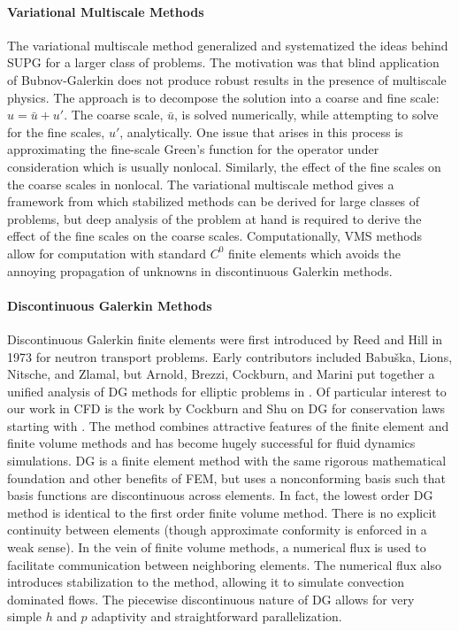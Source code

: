 \documentclass[Dissertation.tex]{subfiles}
\begin{document}
\paragraph{Variational Multiscale Methods}
The variational multiscale method generalized and systematized the ideas behind SUPG for a larger class of problems.
The motivation was that blind application of Bubnov-Galerkin does not produce robust results in the presence of multiscale physics\cite{VMS}.
The approach is to decompose the solution into a coarse and fine scale: $u=\bar u+u'$. The coarse scale, $\bar u$, is solved numerically,
while attempting to solve for the fine scales, $u'$, analytically.
One issue that arises in this process is approximating the fine-scale Green's function for the operator under consideration which is usually nonlocal.
Similarly, the effect of the fine scales on the coarse scales in nonlocal.
The variational multiscale method gives a framework from which stabilized methods can be derived for large classes of problems,
but deep analysis of the problem at hand is required to derive the effect of the fine scales on the coarse scales.
Computationally, VMS methods allow for computation with standard $C^0$ finite elements which avoids the annoying propagation of unknowns in
discontinuous Galerkin methods.

\paragraph{Discontinuous Galerkin Methods}
Discontinuous Galerkin finite elements were first introduced by Reed and Hill in 1973 for neutron transport problems\cite{ReedHillDG}.
Early contributors included Babu\v{s}ka, Lions, Nitsche, and Zlamal, but Arnold, Brezzi, Cockburn, and Marini put together a unified analysis
of DG methods for elliptic problems in \cite{ArnoldDG}.
Of particular interest to our work in CFD is the work by Cockburn and Shu on DG for conservation laws starting with \cite{CockburnShuDG}.
The method combines attractive features of the finite element and finite volume methods and has become hugely successful for fluid dynamics simulations.
DG is a finite element method with the same rigorous mathematical foundation and other benefits of FEM, but uses a nonconforming basis such that basis
functions are discontinuous across elements.
In fact, the lowest order DG method is identical to the first order finite volume method.
There is no explicit continuity between elements (though approximate conformity is enforced in a weak sense).
In the vein of finite volume methods, a numerical flux is used to facilitate communication between neighboring elements.
The numerical flux also introduces stabilization to the method, allowing it to simulate convection dominated flows.
The piecewise discontinuous nature of DG allows for very simple $h$ and $p$ adaptivity and straightforward parallelization.
\end{document}
